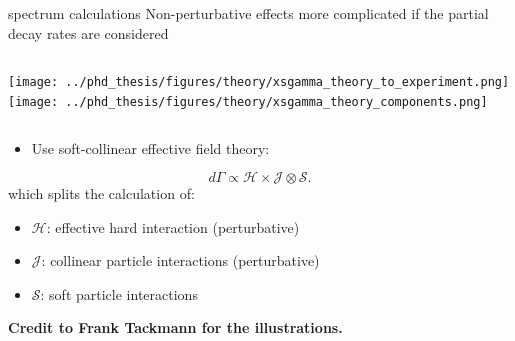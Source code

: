 \documentclass[xcolor=dvipsnames]{beamer}
\begin{document}
\begin{frame}{\safeBtoXsdgamma spectrum calculations}
\scriptsize
   Non-perturbative effects more complicated if the partial decay rates are considered

   \begin{columns}
      \texttt{[image: ../phd\_thesis/figures/theory/xsgamma\_theory\_to\_experiment.png]}
      \texttt{[image: ../phd\_thesis/figures/theory/xsgamma\_theory\_components.png]}
   \end{columns}

   \begin{itemize}
      \item Use soft-collinear effective field theory:
   \end{itemize}
   \begin{equation}\nonumber
      d\Gamma \propto \mathcal{H} \times \mathcal{J} \otimes \mathcal{S}.
  \end{equation}
  which splits the calculation of:
  \begin{itemize}
   \item[] {\color{red}$\mathcal{H}$: effective hard interaction (perturbative)}
   \item[] {\color{blue}$\mathcal{J}$: collinear particle interactions (perturbative)}
   \item[] {\color{orange}$\mathcal{S}$: soft particle interactions}
  \end{itemize}

\vspace{-10pt}

\begin{flushright}
   \tiny \textbf{Credit to Frank Tackmann for the illustrations.}
\end{flushright}

\end{frame}
\end{document}
